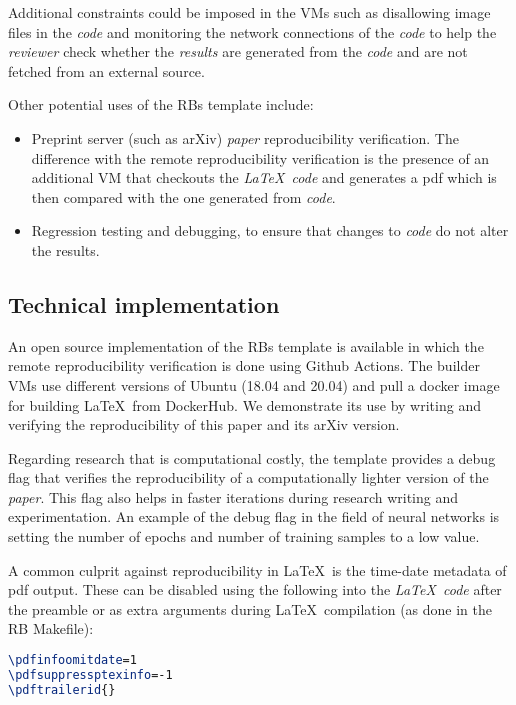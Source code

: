 \documentclass[journal]{IEEEtran}
\begin{document}
Additional constraints could be imposed in the VMs such as disallowing image files in the \textit{code} and monitoring the network connections of the \textit{code} to help the \textit{reviewer} check whether the \textit{results} are generated from the \textit{code} and are not fetched from an external source.

Other potential uses of the RBs template include:
\begin{itemize}
	\item Preprint server (such as arXiv) \textit{paper} reproducibility verification.
		The difference with the remote reproducibility verification is the presence of an additional VM that checkouts the \textit{\LaTeX\ code} and generates a pdf which is then compared with the one generated from \textit{code}.
	\item Regression testing and debugging, to ensure that changes to \textit{code} do not alter the results.
\end{itemize}

\subsection{Technical implementation}
An open source implementation of the RBs template is available in which the remote reproducibility verification is done using Github Actions.
The builder VMs use different versions of Ubuntu (18.04 and 20.04) and pull a docker image for building \LaTeX\ from DockerHub.
We demonstrate its use by writing and verifying the reproducibility of this paper and its arXiv version.

Regarding research that is computational costly, the template provides a debug flag that verifies the reproducibility of a computationally lighter version of the \textit{paper}.
This flag also helps in faster iterations during research writing and experimentation.
An example of the debug flag in the field of neural networks is setting the number of epochs and number of training samples to a low value.

A common culprit against reproducibility in \LaTeX\ is the time-date metadata of pdf output.
These can be disabled using the following into the \textit{\LaTeX\ code} after the preamble or as extra arguments during \LaTeX\ compilation (as done in the RB Makefile):
\begin{lstlisting}[language=TeX, style=lststyle, caption={\LaTeX\ pdf reproducibility commands.}, captionpos=b]
\pdfinfoomitdate=1
\pdfsuppressptexinfo=-1
\pdftrailerid{}
\end{lstlisting}
\end{document}
